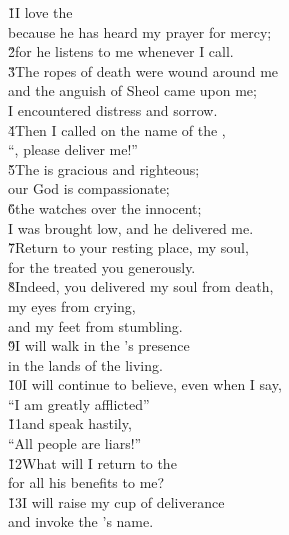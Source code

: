 \begin{poetry}
\poeml \v{1}I love the  \\
\poemll    because he has heard my prayer for mercy; \\
\poeml \v{2}for he listens to me whenever I call. \\
\poeml \v{3}The ropes of death were wound around me \\
\poemll    and the anguish of Sheol came upon me; \\
\poemlll       I encountered distress and sorrow. \\
\poeml \v{4}Then I called on the name of the , \\
\poemll    ``, please deliver me!'' \\
\poeml \v{5}The  is gracious and righteous; \\
\poemll    our God is compassionate; \\
\poeml \v{6}the  watches over the innocent; \\
\poemll    I was brought low, and he delivered me. \\
\poeml \v{7}Return to your resting place, my soul, \\
\poemll    for the  treated you generously. \\
\poeml \v{8}Indeed, you delivered my soul from death, \\
\poemll    my eyes from crying, \\
\poemlll       and my feet from stumbling. \\
\poeml \v{9}I will walk in the 's presence \\
\poemll    in the lands of the living. \\
\poeml \v{10}I will continue to believe, even when I say, \\
\poemll    ``I am greatly afflicted'' \\
\poeml \v{11}and speak hastily, \\
\poemll    ``All people are liars!'' \\
\poeml \v{12}What will I return to the  \\
\poemll    for all his benefits to me? \\
\poeml \v{13}I will raise my cup of deliverance \\
\poemll    and invoke the 's name. \\

\end{poetry}
